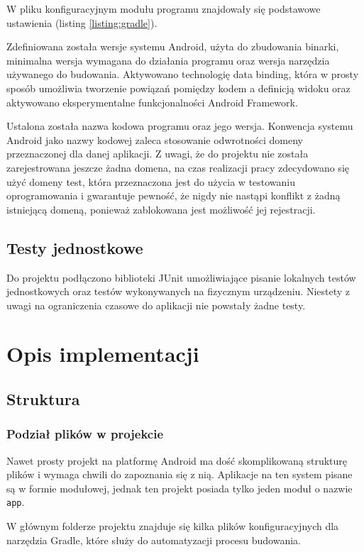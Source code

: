 \documentclass[polish,polish,a4paper,12pt]{article}
\let\sectioncmd\section
\renewcommand{\section}{\clearpage\sectioncmd}
\begin{document}
	W pliku konfiguracyjnym modułu programu znajdowały się podstawowe ustawienia (listing \ref{listing:gradle}).

	Zdefiniowana została wersje systemu Android, użyta do zbudowania binarki, minimalna wersja wymagana do działania programu oraz wersja narzędzia używanego do budowania. Aktywowano technologię data binding, która w prosty sposób umożliwia tworzenie powiązań pomiędzy kodem a definicją widoku oraz aktywowano eksperymentalne funkcjonalności Android Framework.

	Ustalona została nazwa kodowa programu oraz jego wersja. Konwencja systemu Android jako nazwy kodowej zaleca stosowanie odwrotności domeny przeznaczonej dla danej aplikacji. Z uwagi, że do projektu nie została zarejestrowana jeszcze żadna domena, na czas realizacji pracy zdecydowano się użyć domeny test, która przeznaczona jest do użycia w testowaniu oprogramowania i gwarantuje pewność, że nigdy nie nastąpi konflikt z żadną istniejącą domeną, ponieważ zablokowana jest możliwość jej rejestracji.

	\subsection{Testy jednostkowe}

	Do projektu podłączono biblioteki JUnit umożliwiające pisanie lokalnych testów jednostkowych oraz testów wykonywanych na fizycznym urządzeniu. Niestety z uwagi na ograniczenia czasowe do aplikacji nie powstały żadne testy.

\section{Opis implementacji}\label{implementation}
	\subsection{Struktura}
		\subsubsection{Podział plików w projekcie}

		Nawet prosty projekt na platformę Android ma dość skomplikowaną strukturę plików i wymaga chwili do zapoznania się z nią. Aplikacje na ten system pisane są w formie modułowej, jednak ten projekt posiada tylko jeden moduł o nazwie \texttt{app}.

		W głównym folderze projektu znajduje się kilka plików konfiguracyjnych dla narzędzia Gradle, które służy do automatyzacji procesu budowania.
\end{document}
